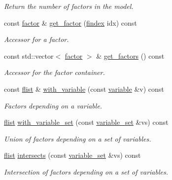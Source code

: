 \begin{DoxyCompactItemize}
\begin{DoxyCompactList}\small\item\em Return the number of factors in the model. \end{DoxyCompactList}\item 
const \hyperlink{classmerlin_1_1factor}{factor} \& \hyperlink{classmerlin_1_1graphical__model_ab2c87e3a4cfa3e511e089f3f6b1bd981}{get\+\_\+factor} (\hyperlink{classmerlin_1_1graphical__model_ab2b46f09d8142bb68f243ecadbdabb6b}{findex} idx) const 
\begin{DoxyCompactList}\small\item\em Accessor for a factor. \end{DoxyCompactList}\item 
const std\+::vector$<$ \hyperlink{classmerlin_1_1factor}{factor} $>$ \& \hyperlink{classmerlin_1_1graphical__model_a0d80510846922ce3cabf088aa04af040}{get\+\_\+factors} () const 
\begin{DoxyCompactList}\small\item\em Accessor for the factor container. \end{DoxyCompactList}\item 
const \hyperlink{classmerlin_1_1graphical__model_a615e25ec6594615fddfd4c3c4776b99f}{flist} \& \hyperlink{classmerlin_1_1graphical__model_a2e00ea842135f7a2169278ce19cda9d9}{with\+\_\+variable} (const \hyperlink{classmerlin_1_1variable}{variable} \&v) const 
\begin{DoxyCompactList}\small\item\em Factors depending on a variable. \end{DoxyCompactList}\item 
\hyperlink{classmerlin_1_1graphical__model_a615e25ec6594615fddfd4c3c4776b99f}{flist} \hyperlink{classmerlin_1_1graphical__model_a24454dad4b1754b5c58a7fa3b2738739}{with\+\_\+variable\+\_\+set} (const \hyperlink{classmerlin_1_1variable__set}{variable\+\_\+set} \&vs) const 
\begin{DoxyCompactList}\small\item\em Union of factors depending on a set of variables. \end{DoxyCompactList}\item 
\hyperlink{classmerlin_1_1graphical__model_a615e25ec6594615fddfd4c3c4776b99f}{flist} \hyperlink{classmerlin_1_1graphical__model_ac2841d98a5d54bc5bf384facb939e57a}{intersects} (const \hyperlink{classmerlin_1_1variable__set}{variable\+\_\+set} \&vs) const 
\begin{DoxyCompactList}\small\item\em Intersection of factors depending on a set of variables. \end{DoxyCompactList}\item 

\end{DoxyCompactItemize}
